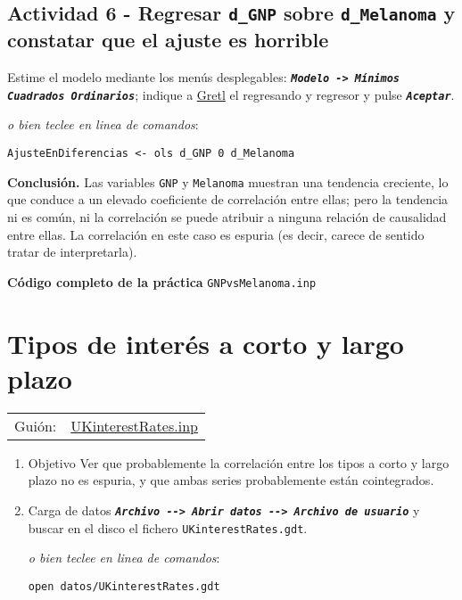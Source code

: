 \documentclass[11pt]{article}
\begin{document}
\subsection{Actividad 6 - Regresar \texttt{d\_GNP} sobre \texttt{d\_Melanoma} y constatar que el ajuste es horrible}
\label{sec:org5a0a75a}

Estime el modelo mediante los menús desplegables: \textbf{\emph{\texttt{Modelo -> Mínimos
  Cuadrados Ordinarios}}}; indique a \href{https://gretl.sourceforge.net/es.html}{Gretl} el regresando y regresor y
  pulse \textbf{\emph{\texttt{Aceptar}}}.

{\vspace{0pt} \footnotesize \color{gray!70!black}
\emph{o bien teclee en linea de comandos}:
\begin{verbatim}
AjusteEnDiferencias <- ols d_GNP 0 d_Melanoma
\end{verbatim}
}

\textbf{Conclusión.} Las variables \texttt{GNP} y \texttt{Melanoma} muestran una tendencia
creciente, lo que conduce a un elevado coeficiente de correlación
entre ellas; pero la tendencia ni es común, ni la correlación se puede
atribuir a ninguna relación de causalidad entre ellas. La correlación
en este caso es espuria (es decir, carece de sentido tratar de
interpretarla).

\vspace{10pt}
\noindent
\textbf{Código completo de la práctica} \texttt{GNPvsMelanoma.inp}
\vspace{10pt}

\clearpage


\section{Tipos de interés a corto y largo plazo}
\label{sec:org5f3b629}
\begin{center}
\begin{tabular}{ll}
Guión: & \href{https://github.com/mbujosab/EconometriaAplicada-SRC/blob/main/Practicas/PracticasGretl/pub/scripts/UKinterestRates.inp}{UKinterestRates.inp}\\[0pt]
\end{tabular}
\end{center}

\begin{enumerate}
\item Objetivo
\label{sec:org0710261}
Ver que probablemente la correlación entre los tipos a corto y largo
plazo no es espuria, y que ambas series probablemente están
cointegrados.

\item Carga de datos
\label{sec:org3e0aea3}
\textbf{\emph{\texttt{Archivo -{}-{}> Abrir datos -{}-{}> Archivo de usuario}}} y buscar en el
disco el fichero \texttt{UKinterestRates.gdt}.

{\vspace{0pt} \footnotesize \color{gray!70!black}
\emph{o bien teclee en linea de comandos}:
\begin{verbatim}
open datos/UKinterestRates.gdt
\end{verbatim}
}
\end{enumerate}
\end{document}

